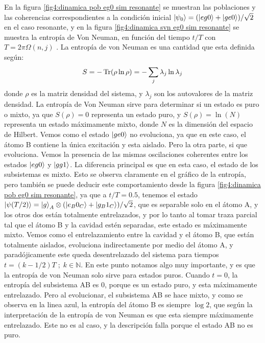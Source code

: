 En la figura \ref{fig4:dinamica pob eg0 sim resonante} se muestran las poblaciones y las coherencias correspondientes a la condición inicial $\ket{\psi_0}=(\ket{eg0} + \ket{ge0})/\sqrt{2}$ en el caso resonante, y en la figura \ref{fig4:dinamica svn eg0 sim resonante} se muestra la entropía de Von Neuman, en función del tiempo $t/T$ con $T=2 \pi \Omega(n,j)$  . La entropía de von Neuman es una cantidad que esta definida según:
\begin{equation}\label{eq4:entropia von neuman}
    S=-\Tr(\rho \ln \rho)=-\sum_j \lambda_j \ln \lambda_j
\end{equation}
donde $\rho$ es la matriz densidad del sistema, y $\lambda_j$ son los autovalores de la matriz densidad. La entropía de Von Neuman sirve para determinar si un estado es puro o mixto, ya que $S(\rho)=0$ representa un estado puro, y $S(\rho)=\ln(N)$ representa un estado máximamente mixto, donde $N$ es la dimensión del espacio de Hilbert.
Vemos como el estado $\ket{ge0}$ no evoluciona, ya que en este caso, el átomo B contiene la única excitación y esta aislado. Pero la otra parte, si que evoluciona. Vemos la presencia de las mismas oscilaciones coherentes entre los estados $\ket{eg0}$ y $\ket{gg1}$. La diferencia principal es que en esta caso, el estado de los subsistemas es mixto. Esto se observa claramente en el gráfico de la entropía, pero también se puede deducir este comportamiento desde la figura \ref{fig4:dinamica pob eg0 sim resonante}, ya que a $t/T=0.5$, tenemos el estado $\ket{\psi(T/2)}=\ket{g}_A\otimes(\ket{e_B0_C}+\ket{g_B1_C})/\sqrt{2}$, que es separable solo en el átomo A, y los otros dos están totalmente entrelazados, y por lo tanto al tomar traza parcial tal que el átomo B y la cavidad estén separadas, este estado es máximamente mixto. Vemos como el entrelazamiento entre la cavidad y el átomo B, que están totalmente aislados, evoluciona indirectamente por medio del átomo A, y paradójicamente este queda desentrelazado del sistema para tiempos $t=(k-1/2)T\; ; \; k \in \mathbb{N}$. En este punto notamos algo muy importante, y es que la entropía de von Neuman solo sirve para estados puros. Cuando $t=0$, la entropía del subsistema AB es 0, porque es un estado puro, y esta máximamente entrelazado. Pero al evolucionar, el subsistema AB se hace mixto, y como se observa en la linea azul, la entropía del átomo B es siempre $\log 2$, que según la interpretación de la entropía de von Neuman es que esta siempre máximamente entrelazado. Este no es al caso, y la descripción falla porque el estado AB no es puro.

